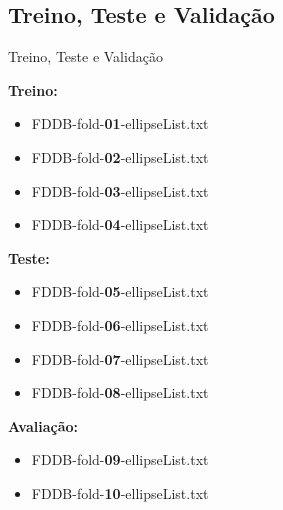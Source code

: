 \documentclass[aspectratio=169, xcolor=dvipsnames]{beamer}
\let\olditem=\item%
\renewcommand{\item}{\olditem \justifying}
\begin{document}
	\subsection{Treino, Teste e Validação}
		\begin{frame}{Treino, Teste e Validação}
			
			\begin{multicols*}{3}
				
				\textbf{Treino:}
				\begin{itemize}
					\setlength\itemsep{0.7em}
					\item FDDB-fold-\textbf{01}-ellipseList.txt
					\item FDDB-fold-\textbf{02}-ellipseList.txt
					\item FDDB-fold-\textbf{03}-ellipseList.txt
					\item FDDB-fold-\textbf{04}-ellipseList.txt
				\end{itemize}
				
				\bigskip
				
				\textbf{Teste:}
				\begin{itemize}
					\setlength\itemsep{0.7em}
					\item FDDB-fold-\textbf{05}-ellipseList.txt
					\item FDDB-fold-\textbf{06}-ellipseList.txt
					\item FDDB-fold-\textbf{07}-ellipseList.txt
					\item FDDB-fold-\textbf{08}-ellipseList.txt
				\end{itemize}
				
				\vspace{3cm}
				
				\textbf{Avaliação:}
				\begin{itemize}
					\setlength\itemsep{0.7em}
					\item FDDB-fold-\textbf{09}-ellipseList.txt
					\item FDDB-fold-\textbf{10}-ellipseList.txt
				\end{itemize}
			\end{multicols*}
		\end{frame}
	
\end{document}
